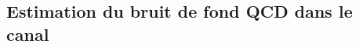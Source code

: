 \subsection{Estimation du bruit de fond QCD dans le canal \ele\mu}\label{chapter-HTT_analysis-section-bg_estimation-QCD-SS}

